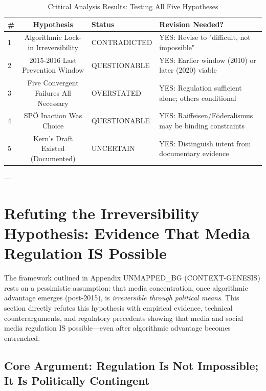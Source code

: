 \begin{table}[h]
\centering
\small
\caption{Critical Analysis Results: Testing All Five Hypotheses}
\label{tab:critical-analysis}
\begin{tabular}{|l|c|l|l|}
\hline
\textbf{\#} & \textbf{Hypothesis} & \textbf{Status} & \textbf{Revision Needed?} \\
\hline
1 & Algorithmic Lock-in Irreversibility & CONTRADICTED & YES: Revise to "difficult, not impossible" \\
\hline
2 & 2015-2016 Last Prevention Window & QUESTIONABLE & YES: Earlier window (2010) or later (2020) viable \\
\hline
3 & Five Convergent Failures All Necessary & OVERSTATED & YES: Regulation sufficient alone; others conditional \\
\hline
4 & SPÖ Inaction Was Choice & QUESTIONABLE & YES: Raiffeisen/Föderalismus may be binding constraints \\
\hline
5 & Kern's Draft Existed (Documented) & UNCERTAIN & YES: Distinguish intent from documentary evidence \\
\hline
\end{tabular}
\end{table}

---


\section*{Refuting the Irreversibility Hypothesis: Evidence That Media Regulation IS Possible}

The framework outlined in Appendix UNMAPPED_BG (CONTEXT-GENESIS) rests on a pessimistic assumption: that media concentration, once algorithmic advantage emerges (post-2015), is \textit{irreversible through political means}. This section directly refutes this hypothesis with empirical evidence, technical counterarguments, and regulatory precedents showing that media and social media regulation IS possible—even after algorithmic advantage becomes entrenched.

\subsection*{Core Argument: Regulation Is Not Impossible; It Is Politically Contingent}

